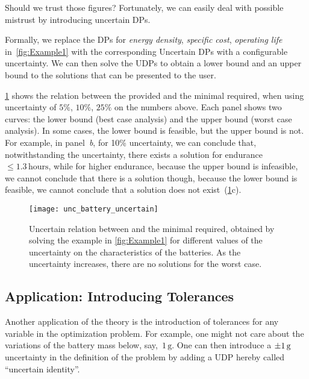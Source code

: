 Should we trust those figures? Fortunately, we can easily deal with
possible mistrust by introducing uncertain DPs.

Formally, we replace the DPs for\emph{ energy density}, \emph{specific
cost}, \emph{operating life} in~\cref{fig:Example1} with the
corresponding Uncertain DPs with a configurable uncertainty. We can
then solve the UDPs to obtain a lower bound and an upper bound to
the solutions that can be presented to the user.

\cref{fig:unc_battery_uncertain} shows the relation between
the provided  and the minimal  required,
when using uncertainty of $5\%$, $10\%$, $25\%$ on the numbers
above. Each panel shows two curves: the lower bound (best case analysis)
and the upper bound (worst case analysis). In some cases, the lower
bound is feasible, but the upper bound is not. For example, in panel~\emph{b},
for 10\% uncertainty, we can conclude that, notwithstanding the uncertainty,
there exists a solution for endurance~$\leq1.3\,\text{hours}$, while
for higher endurance, because the upper bound is infeasible, we cannot
conclude that there is a solution \textemdash{} though, because the
lower bound is feasible, we cannot conclude that a solution does not
exist~(\cref{fig:unc_battery_uncertain}c).

\begin{figure}[h]
    \begin{centering}
        \texttt{[image: unc\_battery\_uncertain]}
    \end{centering}
    \caption{Uncertain relation between 
    and the minimal  required, obtained by solving the
    example in \cref{fig:Example1} for different values of the uncertainty
    on the characteristics of the batteries. As the uncertainty increases,
        there are no solutions for the worst case.}
    \label{fig:unc_battery_uncertain}
\end{figure}

\subsection{Application: Introducing Tolerances\label{sec:Application-tolerance}}

Another application of the theory is the introduction of tolerances
for any variable in the optimization problem. For example, one might
not care about the variations of the battery mass below, say,~$1\,\text{g}$.
One can then introduce a $\pm1\,\text{\ensuremath{\text{g}} }$ uncertainty
in the definition of the problem by adding a UDP hereby called ``uncertain
identity''.

